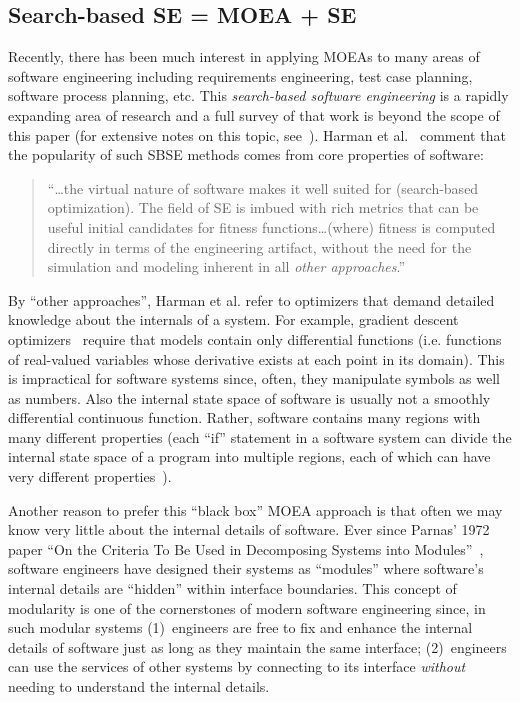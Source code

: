 \documentclass[10pt,journal,compsoc]{IEEEtran}
\newenvironment{changed}{\par}{\par}
\begin{document}
\begin{changed}
\subsection{Search-based SE = MOEA + SE}\label{sec:abutsbse}
Recently, there has been much interest in applying MOEAs to many areas of software engineering including requirements engineering, test case planning, software process planning, etc. 
This {\em search-based software engineering} is a  rapidly expanding area of research and a full survey of that work is beyond the scope of this paper (for extensive notes on this topic, see~\cite{harman12abc,harman14}). 
Harman et al.~\cite{harman12abc} comment that the popularity of such SBSE methods comes from core properties of software:
\begin{quote}
``{\ldots}the virtual nature of software makes it well suited for (search-based optimization). The field of SE is imbued with rich metrics that can be useful initial candidates for fitness functions{\ldots}(where) fitness is computed directly in terms of the engineering artifact, without the need for the simulation and modeling inherent in all {\em other approaches}.''
\end{quote}
By  ``other approaches'', Harman et al. refer to optimizers that demand detailed knowledge  about  the internals of a system. 
For example, gradient descent optimizers~\cite{saltelli00} require that models contain only differential functions (i.e. functions of real-valued variables whose derivative exists at each point in its domain).
This is impractical  for  software systems since, often, they manipulate symbols as well as numbers.
Also the  internal state space of software is usually not a smoothly differential continuous function.
Rather, software contains many regions with many different properties (each ``if'' statement in a software system can divide the internal state space of a program into multiple regions, each of which can have very different properties~\cite{lowrey98}).

Another reason to prefer this ``black box'' MOEA approach is that often we may know  very little about the internal details of software.
Ever since Parnas' 1972 paper ``On the Criteria To Be Used in Decomposing Systems into Modules''~\cite{parnas72}, software engineers have designed their systems as ``modules'' where software's internal details are ``hidden'' within interface boundaries.  
This concept of modularity is one of the cornerstones of modern software engineering since, in such modular systems (1)~engineers are free to fix and enhance the internal details of software just as long as they maintain the same interface;
(2)~engineers can use the services of other systems by connecting to its interface {\em without} needing to understand the internal details.


\end{changed}
\end{document}
